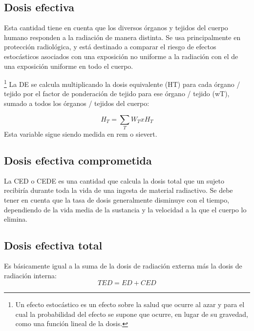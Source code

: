 \documentclass[12pt,fleqn]{book} %
\numberwithin{equation}{section} %
\numberwithin{figure}{section} %
\numberwithin{table}{section} %
\begin{document}
{\subsection{Dosis efectiva}
Esta cantidad  tiene en cuenta que los diversos órganos y tejidos del cuerpo humano responden a la radiación de manera distinta. Se usa principalmente en protección radiológica, y está destinado a comparar el riesgo de efectos estocásticos asociados con una exposición no uniforme a la radiación con el de una exposición uniforme en todo el cuerpo. 

\footnote{ Un efecto estocástico es un efecto sobre la salud que ocurre al azar y para el cual la probabilidad del efecto se supone que ocurre, en lugar de su gravedad, como una función lineal de la dosis.}
La DE se calcula multiplicando la dosis equivalente (HT) para cada órgano / tejido por el factor de ponderación de tejido para ese órgano / tejido (wT), sumado a todos los órganos / tejidos del cuerpo:

\begin{equation}
H_{T}=\sum_{T} W_{T}   x    H_{T}
\end{equation}
Esta variable sigue siendo medida en rem o sievert.

\subsection{Dosis efectiva comprometida}

La CED o CEDE es una cantidad que calcula la dosis total que un sujeto recibiría durante toda la vida de una ingesta de material radiactivo. Se debe tener en cuenta que la tasa de dosis generalmente disminuye con el tiempo, dependiendo de la vida media de la sustancia y la velocidad a la que el cuerpo lo elimina.
\subsection{Dosis efectiva total}

Es básicamente igual a la suma de la dosis de radiación  externa más la dosis de radiación interna:
\begin{equation} 
TED = ED + CED
\end{equation}


}
\end{document}
